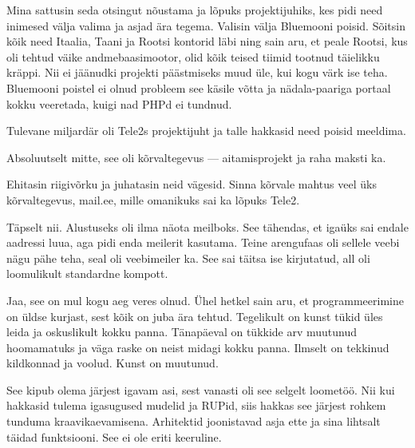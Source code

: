 Mina sattusin seda otsingut nõustama ja lõpuks projektijuhiks, kes 
pidi need inimesed välja valima ja asjad ära tegema. Valisin välja 
Bluemooni poisid. Sõitsin kõik need Itaalia, 
Taani ja Rootsi kontorid läbi ning sain aru, et peale Rootsi, kus oli tehtud väike 
andmebaasimootor, olid kõik teised tiimid tootnud täielikku kräppi. Nii ei 
jäänudki projekti päästmiseks muud üle, kui kogu värk ise teha. Bluemooni
poistel ei olnud probleem see käsile võtta ja nädala-paariga 
portaal kokku veeretada, kuigi nad PHPd ei tundnud.

Tulevane miljardär oli Tele2s projektijuht ja talle 
hakkasid need poisid meeldima. 


Absoluutselt mitte, see oli kõrvaltegevus --- aitamisprojekt ja raha 
maksti ka.


Ehitasin riigivõrku ja juhatasin neid 
vägesid. Sinna kõrvale mahtus veel üks kõrvaltegevus, 
mail.ee, mille omanikuks sai ka lõpuks Tele2. 


Täpselt nii. Alustuseks oli ilma näota 
meilboks. See tähendas, et igaüks sai endale aadressi luua, aga pidi enda 
meilerit kasutama. Teine arengufaas oli sellele veebi nägu pähe teha, seal oli veebimeiler ka. See sai täitsa ise kirjutatud, all 
oli loomulikult standardne kompott. 


Jaa, see on mul kogu aeg veres olnud. Ühel hetkel sain aru, et 
programmeerimine on üldse kurjast, sest kõik on juba ära tehtud. 
Tegelikult on kunst tükid üles leida ja oskuslikult kokku panna. 
Tänapäeval on tükkide arv muutunud hoomamatuks ja väga raske on neist midagi kokku panna. Ilmselt on 
tekkinud kildkonnad ja voolud. Kunst on muutunud.


See kipub olema järjest igavam asi, sest vanasti oli 
see selgelt loometöö. Nii kui hakkasid tulema igasugused 
mudelid ja RUPid, siis hakkas see
järjest rohkem tunduma kraavikaevamisena. Arhitektid joonistavad asja ette ja sina lihtsalt täidad 
funktsiooni. See ei ole eriti keeruline. 

